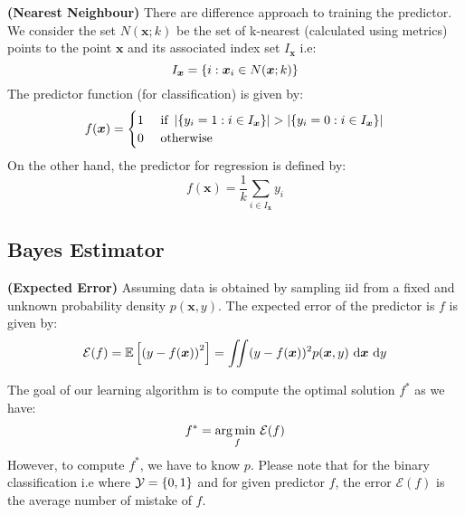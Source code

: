 \begin{definition}{\textbf{(Nearest Neighbour)}}
    There are difference approach to training the predictor. We consider the set $N(\boldsymbol x; k)$ be the set of k-nearest (calculated using metrics) points to the point $\boldsymbol x$ and its associated index set $I_{\boldsymbol x}$ i.e:
    \begin{equation*}
        I_{\boldsymbol x} = \left\{ i : \boldsymbol x_i \in N(\boldsymbol x ; k) \right\}
    \end{equation*}
    The predictor function (for classification) is given by:
    \begin{equation*}
        f(\boldsymbol x) = \begin{cases}
            1 & \text{ if } \left| \left\{ y_i = 1 : i \in I_{\boldsymbol x} \right\} \right| > \left| \left\{ y_i = 0 : i \in I_{\boldsymbol x} \right\} \right| \\
            0 & \text{ otherwise }
        \end{cases}
    \end{equation*}
    On the other hand, the predictor for regression is defined by:
    \begin{equation*}
        f(\boldsymbol x) = \frac{1}{k}\sum_{i\in I_{\boldsymbol x}} y_i
    \end{equation*}
\end{definition}

\subsection{Bayes Estimator}

\begin{definition}{\textbf{(Expected Error)}}
    Assuming data is obtained by sampling iid from a fixed and unknown probability density $p(\boldsymbol x, y)$. The expected error of the predictor is $f$ is given by:
    \begin{equation*}
        \mathcal{E}(f) = \mathbb{E}\left[ \left( y - f(\boldsymbol x) \right)^2 \right] = \iint (y - f(\boldsymbol x))^2p(\boldsymbol x, y)\ \mathrm{d} \boldsymbol x\ \mathrm{d} y
    \end{equation*}
\end{definition}

\begin{remark}
    The goal of our learning algorithm is to compute the optimal solution $f^*$ as we have:
    \begin{equation*}
        f^* = \underset{f}{\arg\min \ } \mathcal{E}(f)
    \end{equation*}
    However, to compute $f^*$, we have to know $p$. Please note that for the binary classification i.e where $\mathcal{Y} = \left\{ 0, 1 \right\}$ and for given predictor $f$, the error $\mathcal{E}(f)$ is the average number of mistake of $f$. 
\end{remark}


